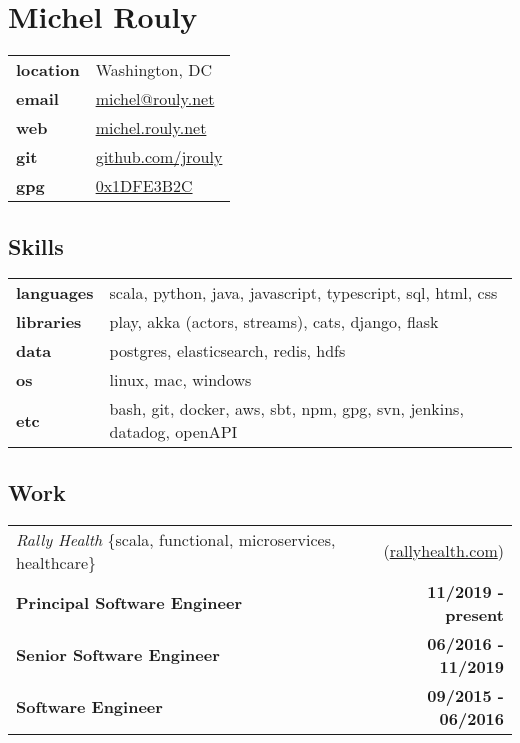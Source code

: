 \documentclass[10pt,letterpaper]{article}
\begin{document}
\setcounter{secnumdepth}{0}

\section{Michel Rouly}


\begin{tabularx}{\textwidth}{@{}lX@{}}
  \textbf{location} & Washington, DC \\
  \textbf{email} & \href{mailto:michel@rouly.net}{michel@rouly.net} \\
  \textbf{web} & \href{https://michel.rouly.net}{michel.rouly.net} \\
  \textbf{git} & \href{https://github.com/jrouly}{github.com/jrouly} \\
  \textbf{gpg} & \href{http://keys.gnupg.net/pks/lookup?op=get\&search=0x68E925EE1DFE3B2C}{0x1DFE3B2C}
\end{tabularx}


\subsection{Skills}

\noindent
\begin{tabularx}{\textwidth}{@{}lX@{}}
  \textbf{languages} & scala, python, java, javascript, typescript, sql, html, css \\
  \textbf{libraries} & play, akka (actors, streams), cats, django, flask \\
  \textbf{data} & postgres, elasticsearch, redis, hdfs \\
  \textbf{os} & linux, mac, windows \\
  \textbf{etc} & bash, git, docker, aws, sbt, npm, gpg, svn, jenkins, datadog, openAPI
\end{tabularx}


\subsection{Work}


\noindent\begin{tabularx}{\textwidth}{@{}X r@{}}
  \textit{Rally Health} \{scala, functional, microservices, healthcare\} & (\href{https://rallyhealth.com}{rallyhealth.com}) \\
  \textbf{Principal Software Engineer} & \textbf{11/2019 - present} \\
  \textbf{Senior Software Engineer} & \textbf{06/2016 - 11/2019} \\
  \textbf{Software Engineer} & \textbf{09/2015 - 06/2016} \\
\end{tabularx}
\end{document}
